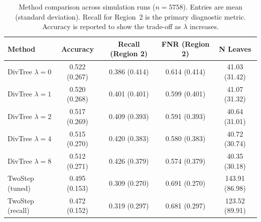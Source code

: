 \begin{table}[htp!]
\centering
\small
\begin{tabular}{lcccc}
\toprule
Method & Accuracy & Recall (Region 2) & FNR (Region 2) & N Leaves \\
\midrule
DivTree $\lambda=0$ & 0.522 (0.267) & 0.386 (0.414) & 0.614 (0.414) & 41.03 (31.42) \\
DivTree $\lambda=1$ & 0.520 (0.268) & 0.401 (0.401) & 0.599 (0.401) & 41.07 (31.32) \\
DivTree $\lambda=2$ & 0.517 (0.269) & 0.409 (0.393) & 0.591 (0.393) & 40.64 (31.01) \\
DivTree $\lambda=4$ & 0.515 (0.270) & 0.420 (0.383) & 0.580 (0.383) & 40.72 (30.74) \\
DivTree $\lambda=8$ & 0.512 (0.271) & 0.426 (0.379) & 0.574 (0.379) & 40.35 (30.18) \\
TwoStep (tuned) & 0.495 (0.153) & 0.309 (0.270) & 0.691 (0.270) & 143.91 (86.98) \\
TwoStep (recall) & 0.472 (0.152) & 0.319 (0.297) & 0.681 (0.297) & 123.52 (89.91) \\
\bottomrule
\end{tabular}
\caption{\label{tab:method-comparison}
Method comparison across simulation runs ($n=5758$). Entries are mean (standard deviation). Recall for Region~2 is the primary diagnostic metric. Accuracy is reported to show the trade-off as $\lambda$ increases.}
\end{table}
